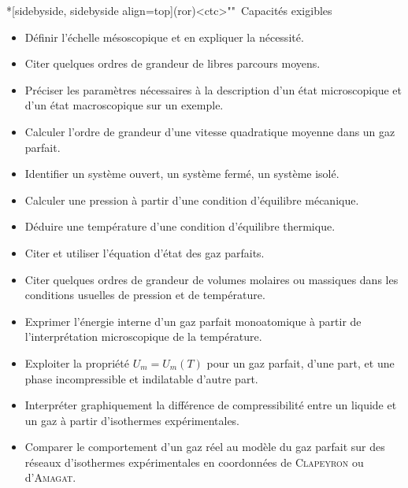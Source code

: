 \documentclass[../../main/main.tex]{subfiles}
\begin{document}
\begin{tcn}*[sidebyside, sidebyside align=top](ror)<ctc>""{\iconhow~Capacités exigibles}
	\small
	\begin{itemize}[label=\rcheck]
		\item Définir l'échelle mésoscopique et en expliquer la nécessité.
		\item Citer quelques ordres de grandeur de libres parcours moyens.
		\item Préciser les paramètres nécessaires à la description d'un état
		      microscopique et d'un état macroscopique sur un exemple.
		\item Calculer l'ordre de grandeur d'une vitesse quadratique moyenne dans un
		      gaz parfait.
		\item Identifier un système ouvert, un système fermé, un système isolé.
		\item Calculer une pression à partir d'une condition d'équilibre mécanique.
		\item Déduire une température d'une condition d'équilibre thermique.
		\item Citer et utiliser l'équation d'état des gaz parfaits.
	\end{itemize}
	\tcblower
	\begin{itemize}[label=\rcheck]
		\item Citer quelques ordres de grandeur de volumes molaires ou massiques
		      dans les conditions usuelles de pression et de température.
		\item Exprimer l'énergie interne d'un gaz parfait monoatomique à partir de
		      l'interprétation microscopique de la température.
		\item Exploiter la propriété $U_m = U_m(T)$ pour un gaz parfait, d'une part,
		      et une phase incompressible et indilatable d'autre part.
		\item Interpréter graphiquement la différence de compressibilité entre un
		      liquide et un gaz à partir d'isothermes expérimentales.
		\item Comparer le comportement d'un gaz réel au modèle du gaz parfait sur
		      des réseaux d'isothermes expérimentales en coordonnées de
		      \textsc{Clapeyron} ou d'\textsc{Amagat}.
	\end{itemize}
\end{tcn}
\vspace{-15pt}
\end{document}
